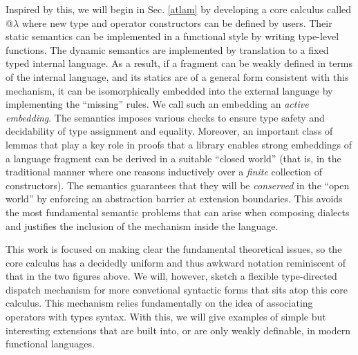 Inspired by this, we will begin in Sec. \ref{atlam} by developing a core calculus called @$\lambda$ where new type and operator constructors can be defined by users. Their static semantics can be implemented in a functional style by writing type-level functions. The dynamic semantics are implemented by translation to a fixed typed internal language. As a result, if a fragment can be weakly defined in terms of the internal language, and its statics are of a general form consistent with this mechanism, it can be isomorphically embedded into the external language by implementing the ``missing'' rules. We call such an embedding an \emph{active embedding}. The semantics imposes various checks to ensure type safety and decidability of type assignment and equality. Moreover, an important class of lemmas that play a key role in  proofs that a library enables strong embeddings of a language fragment can be derived in a suitable ``closed world'' (that is, in the traditional manner where one reasons inductively over a \emph{finite} collection of constructors). The semantics guarantees that they will be \emph{conserved} in the  ``open world'' by enforcing an abstraction barrier at extension boundaries. This avoids the most fundamental semantic problems that can arise when composing dialects and justifies the inclusion of the mechanism inside the language.

This work is focused on making clear the fundamental theoretical issues, so  the core calculus has a decidedly uniform and thus awkward notation reminiscent of that in the two figures above. We will, however, sketch a flexible type-directed dispatch mechanism for more convetional syntactic forms that sits atop this core calculus. This mechanism relies fundamentally on the idea of associating operators with types  syntax. With this, we will give examples of simple but interesting extensions that are built into, or are only weakly definable, in modern functional languages. 

